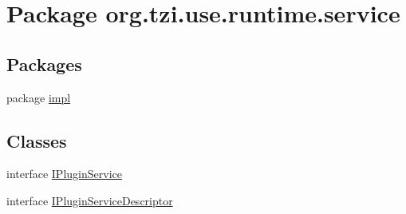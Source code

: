 \hypertarget{namespaceorg_1_1tzi_1_1use_1_1runtime_1_1service}{\section{Package org.\-tzi.\-use.\-runtime.\-service}
\label{namespaceorg_1_1tzi_1_1use_1_1runtime_1_1service}
}
\subsection*{Packages}
\begin{DoxyCompactItemize}
\item 
package \hyperlink{namespaceorg_1_1tzi_1_1use_1_1runtime_1_1service_1_1impl}{impl}
\end{DoxyCompactItemize}
\subsection*{Classes}
\begin{DoxyCompactItemize}
\item 
interface \hyperlink{interfaceorg_1_1tzi_1_1use_1_1runtime_1_1service_1_1_i_plugin_service}{I\-Plugin\-Service}
\item 
interface \hyperlink{interfaceorg_1_1tzi_1_1use_1_1runtime_1_1service_1_1_i_plugin_service_descriptor}{I\-Plugin\-Service\-Descriptor}
\end{DoxyCompactItemize}
